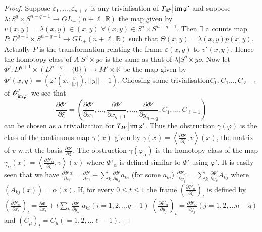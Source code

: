 \begin{proof}
Suppose $\varepsilon_1, \ldots, \varepsilon_{n+\ell}$ is any
trivialisation of $T_{M'} \big|\operatorname{im} \varphi'$ and suppose $\lambda: S^q
\times S^{n-q-1}\rightarrow GL_+ (n+\ell,\mathbb{R})$ the map given by
$v(x,y) = \lambda (x, y) \in (x, y)$ $\forall (x, y) \in
S^q \times S^{n-q-1}$. Then $\exists$ a counts map $P: D^{q+1}\times
S^{n-q-1}\rightarrow GL_+ (n+\ell, \mathbb{R})$ such that $\Theta(x,
y) = \lambda(x,y) p (x,y)$. Actually $P$ is the transformation
relating the frame $\varepsilon(x, y)$ to $v'(x, y) $. Hence the
homotopy class of $A| S^q \times yo$ is the same as that of $\lambda
\big|S^q\times yo$. Now let $\Phi': D^{q+1}\times (D^{n-q} - \{0\} )
\rightarrow M' \times \mathbb{R}$ be the map given by $\Phi'(x,y) =
(\varphi' (x, \frac{y}{|| y ||}), ||y||-1)$. Choosing some
trivialisation\pageoriginale $C_0, C_1 \ldots, C_{\ell-1}$ of
$\mathscr{O}^\ell_{\operatorname{im}\varphi'}$ we see that  
$$
 \frac{\partial \Phi'}{\partial \xi} = \left( \dfrac{\partial
  \Phi'}{\partial x_1}, \ldots, \dfrac{\partial \Phi'}{\partial
  x_{q+1}}, \ldots, \dfrac{\partial \Phi'}{\partial y_{n-q}}, C_1,
\ldots , C_{\ell-1} \right)
 $$
 can be chosen as a trivialization for
$T_{M'} \big| \operatorname{im} \varphi '$. Thus the obstruction $\gamma (\varphi)$ is
the class of the continuous map $\gamma(x)$ given by $\gamma(x) =
\left\langle \frac{\partial \Phi'}{\partial\xi}, v \right\rangle
(x)$, the matrix of $v$ w.r.t the basis $\frac{\partial
  \Phi'}{\partial \xi}$. The obstruction $\gamma (\varphi_\alpha)$ is
the homotopy class of the map $\gamma_\alpha(x) = \left\langle
\frac{\partial \Phi'_\alpha}{\partial \xi}, v \right\rangle (x)$ where
$\Phi'_\alpha $ is defined similar to $\Phi'$ using $\varphi'$. It is
easily seen that we have $\frac{\partial\Phi' \alpha}{\partial x_i}
= \frac{\partial\Phi'}{\partial x_i} + \sum\limits_{k}\frac{\partial
  \Phi'}{\partial y_k} a_{ki}$ (for some $a_{ki}$) $\frac{\partial
  \Phi'_\alpha}{\partial y_j} = \sum\limits_{k}
\frac{\partial\Phi'}{\partial y_k}A_{kj}$ where $(A_{kj}(x)) = \alpha
(x)$. If, for every $0 \leq t \leq 1$ the frame
$\left(\frac{\partial\Phi'_\alpha }{\partial \xi }\right)_t$ is defined
by $\left(\frac{\partial\Phi'_\alpha }{\partial x_i }\right)_t =
\frac{\partial \Phi'}{\partial x_i}+ t
\sum\limits_{k}\frac{\partial\Phi'}{\partial y_k} \; a_{ki}(i =1,2,\ldots
q+1) $ 
$\left(\frac{\partial \Phi'_\alpha}{\partial y_j} \right)_t =
\frac{\partial \Phi'_\alpha }{\partial y_j}(j = 1,2,\ldots n-q) $ and  
$ (C_\mu )_t = C_\mu ( = 1, 2, \ldots \ell-1)$.  


\end{proof}
